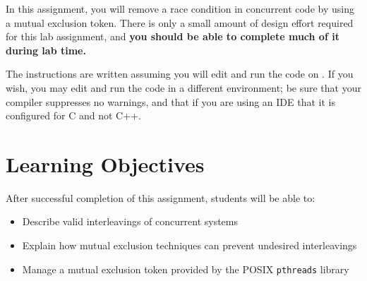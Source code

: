 




\renewcommand{\labnumber}{\duplicatorlabnumber}
\renewcommand{\labname}{Race Condition Elimination Lab}
\renewcommand{\shortlabname}{duplicatorlab}
\renewcommand{\collaborationrules}{\duplicatorlabcollaboration}
\renewcommand{\duedate}{\duplicatorlabdue}

\pagelayout

    \labidentifier

    In this assignment, you will remove a race condition in concurrent code by using a mutual exclusion token.
    There is only a small amount of design effort required for this lab assignment, and \textbf{you should be able to complete much of it during lab time.}

    The instructions are written assuming you will edit and run the code on \runtimeenvironment.
    If you wish, you may edit and run the code in a different environment;
    be sure that your compiler suppresses no warnings, and that if you are using an IDE that it is configured for C and not C++.

    \section*{Learning Objectives}

    After successful completion of this assignment, students will be able to:
    \begin{itemize}
        \item Describe valid interleavings of concurrent systems
        \item Explain how mutual exclusion techniques can prevent undesired interleavings
        \item Manage a mutual exclusion token provided by the POSIX \texttt{pthreads} library
    \end{itemize}

